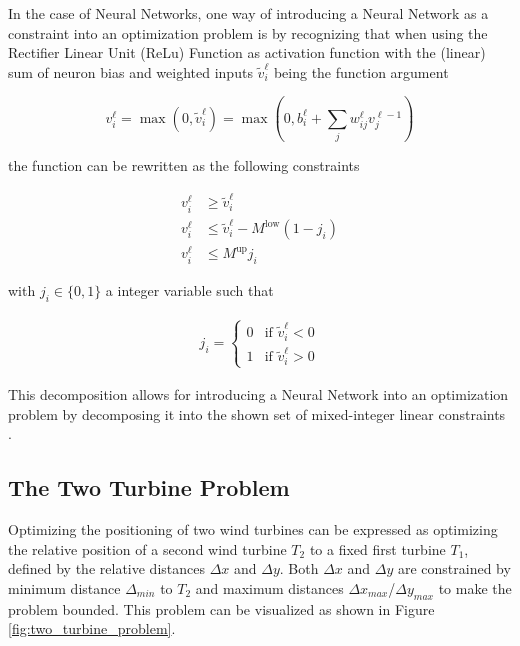 \documentclass[preprint,12pt]{elsarticle}
\begin{document}
In the case of Neural Networks, one way of introducing a Neural Network as a constraint into an optimization problem is by recognizing that when using the Rectifier Linear Unit (ReLu) Function as activation function with the (linear) sum of neuron bias and weighted inputs $\tilde{v}_i^\ell$ being the function argument


\begin{equation}
	v_i^\ell = \max(0, \tilde{v}_i^\ell) = \max(0,  b_i^\ell + \sum_j w_{ij}^\ell v_j^{\ell - 1})
\end{equation}


the function can be rewritten as the following constraints 

\begin{align}
	v_i^\ell &\geq \tilde{v}_i^\ell \\
	v_i^\ell &\leq \tilde{v}_i^\ell - M^{\text{low}}(1 - j_i) \\
	v_i^\ell &\leq M^{\text{up}} j_i
\end{align}

with $j_i \in \{0,1\}$ a integer variable such that

\begin{align}
	j_i =
	\begin{cases}
		0 & \text{if } \tilde{v}_i^\ell < 0 \\
		1 & \text{if } \tilde{v}_i^\ell > 0
	\end{cases}
\end{align}

This decomposition allows for introducing a Neural Network into an optimization problem by decomposing it into the shown set of mixed-integer linear constraints \cite{ALCANTARA2023120895}.

\subsection{The Two Turbine Problem}

Optimizing the positioning of two wind turbines can be expressed as optimizing the relative position of a second wind turbine $T_2$ to a fixed first turbine $T_1$, defined by the relative distances $\Delta x$ and  $\Delta y$. Both  $\Delta x$ and  $\Delta y$ are constrained by minimum distance $\Delta_{min}$ to  $T_2$ and maximum distances $\Delta x_{max}$/$\Delta y_{max}$ to make the problem bounded. 
This problem can be visualized as shown in Figure \ref{fig:two_turbine_problem}.
\end{document}
